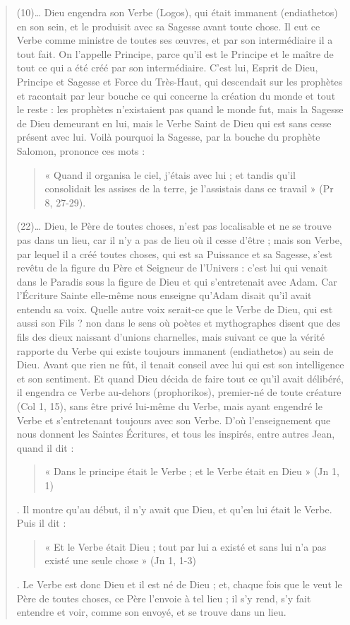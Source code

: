     
    \begin{quote}
        
(10)… Dieu engendra son Verbe (Logos), qui était immanent (endiathetos) en son sein, et le produisit avec sa Sagesse avant toute chose. Il eut ce Verbe comme ministre de toutes ses œuvres, et par son intermédiaire il a tout fait. On l’appelle Principe, parce qu’il est le Principe et le maître de tout ce qui a été créé par son intermédiaire. C’est lui, Esprit de Dieu, Principe et Sagesse et Force du Très-Haut, qui descendait sur les prophètes et racontait par leur bouche ce qui concerne la création du monde et tout le reste : les prophètes n’existaient pas quand le monde fut, mais la Sagesse de Dieu demeurant en lui, mais le Verbe Saint de Dieu qui est sans cesse présent avec lui. Voilà pourquoi la Sagesse, par la bouche du prophète Salomon, prononce ces mots : \begin{quote}
    « Quand il organisa le ciel, j’étais avec lui ; et tandis qu’il consolidait les assises de la terre, je l’assistais dans ce travail » (Pr 8, 27-29).
\end{quote}
(22)… Dieu, le Père de toutes choses, n’est pas localisable et ne se trouve pas dans un lieu, car il n’y a pas de lieu où il cesse d’être ; mais son Verbe, par lequel il a créé toutes choses, qui est sa Puissance et sa Sagesse, s’est revêtu de la figure du Père et Seigneur de l’Univers : c’est lui qui venait dans le Paradis sous la figure de Dieu et qui s’entretenait avec Adam. Car l’Écriture Sainte elle-même nous enseigne qu’Adam disait qu’il avait entendu sa voix. Quelle autre voix serait-ce que le Verbe de Dieu, qui est aussi son Fils ? non dans le sens où poètes et mythographes disent que des fils des dieux naissant d’unions charnelles, mais suivant ce que la vérité rapporte du Verbe qui existe toujours immanent (endiathetos) au sein de Dieu.
Avant que rien ne fût, il tenait conseil avec lui qui est son intelligence et son sentiment. Et quand Dieu décida de faire tout ce qu’il avait délibéré, il engendra ce Verbe au-dehors (prophorikos), premier-né de toute créature (Col 1, 15), sans être privé lui-même du Verbe, mais ayant engendré le Verbe et s’entretenant toujours avec son Verbe.
D’où l’enseignement que nous donnent les Saintes Écritures, et tous les inspirés, entre autres Jean, quand il dit : \begin{quote}
    « Dans le principe était le Verbe ; et le Verbe était en Dieu » (Jn 1, 1)
\end{quote} . Il montre qu’au début, il n’y avait que Dieu, et qu’en lui était le Verbe. Puis il dit : \begin{quote}
    « Et le Verbe était Dieu ; tout par lui a existé et sans lui n’a pas existé une seule chose » (Jn 1, 1-3)
\end{quote}. Le Verbe est donc Dieu et il est né de Dieu ; et, chaque fois que le veut le Père de toutes choses, ce Père l’envoie à tel lieu ; il s’y rend, s’y fait entendre et voir, comme son envoyé, et se trouve dans un lieu.
 

    \end{quote}
